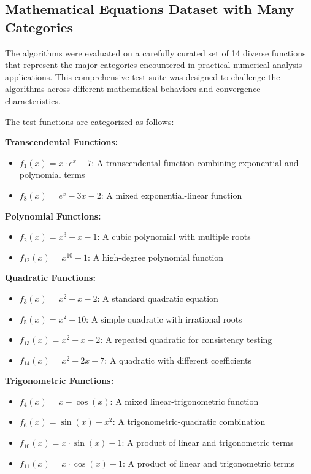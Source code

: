 \documentclass[amsmath, amssymb, aps]{revtex4-2}
\begin{document}
\subsection{Mathematical Equations Dataset with Many Categories}

The algorithms were evaluated on a carefully curated set of 14 diverse functions that represent the major categories encountered in practical numerical analysis applications. This comprehensive test suite was designed to challenge the algorithms across different mathematical behaviors and convergence characteristics.

The test functions are categorized as follows:

\textbf{Transcendental Functions:}
\begin{itemize}
\item $f_1(x) = x \cdot e^x - 7$: A transcendental function combining exponential and polynomial terms
\item $f_8(x) = e^x - 3x - 2$: A mixed exponential-linear function
\end{itemize}

\textbf{Polynomial Functions:}
\begin{itemize}
\item $f_2(x) = x^3 - x - 1$: A cubic polynomial with multiple roots
\item $f_{12}(x) = x^{10} - 1$: A high-degree polynomial function
\end{itemize}

\textbf{Quadratic Functions:}
\begin{itemize}
\item $f_3(x) = x^2 - x - 2$: A standard quadratic equation
\item $f_5(x) = x^2 - 10$: A simple quadratic with irrational roots
\item $f_{13}(x) = x^2 - x - 2$: A repeated quadratic for consistency testing
\item $f_{14}(x) = x^2 + 2x - 7$: A quadratic with different coefficients
\end{itemize}

\textbf{Trigonometric Functions:}
\begin{itemize}
\item $f_4(x) = x - \cos(x)$: A mixed linear-trigonometric function
\item $f_6(x) = \sin(x) - x^2$: A trigonometric-quadratic combination
\item $f_{10}(x) = x \cdot \sin(x) - 1$: A product of linear and trigonometric terms
\item $f_{11}(x) = x \cdot \cos(x) + 1$: A product of linear and trigonometric terms
\end{itemize}
\end{document}

